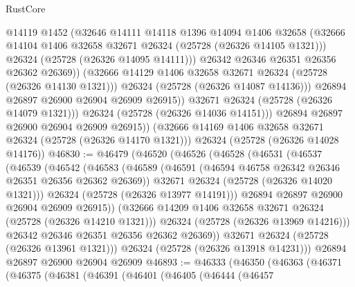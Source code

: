 \begin{lexlean}{RustCore}
\begin{coremodule}
                      @14119
                      @1452
                      (@32646
                        @14111
                        @14118
                        @1396
                        @14094
                        @1406
                        @32658
                        (@32666 @14104 @1406 @32658 @32671 @26324 (@25728 (@26326 @14105 @1321)))
                        @26324
                        (@25728 (@26326 @14095 @14111)))
                      @26342
                      @26346
                      @26351
                      @26356
                      @26362
                      @26369))
                  (@32666 @14129 @1406 @32658 @32671 @26324 (@25728 (@26326 @14130 @1321)))
                  @26324
                  (@25728 (@26326 @14087 @14136)))
                @26894
                @26897
                @26900
                @26904
                @26909
                @26915))
            @32671
            @26324
            (@25728 (@26326 @14079 @1321)))
          @26324
          (@25728 (@26326 @14036 @14151)))
        @26894
        @26897
        @26900
        @26904
        @26909
        @26915))
    (@32666 @14169 @1406 @32658 @32671 @26324 (@25728 (@26326 @14170 @1321)))
    @26324
    (@25728 (@26326 @14028 @14176))
@46830 := @46479
    (@46520
      (@46526
        (@46528
          (@46531
            (@46537
              (@46539
                (@46542
                  (@46583
                    (@46589
                      (@46591 (@46594 @46758 @26342 @26346 @26351 @26356 @26362 @26369))
                      @32671
                      @26324
                      (@25728 (@26326 @14020 @1321)))
                    @26324
                    (@25728 (@26326 @13977 @14191)))
                  @26894
                  @26897
                  @26900
                  @26904
                  @26909
                  @26915))
              (@32666 @14209 @1406 @32658 @32671 @26324 (@25728 (@26326 @14210 @1321)))
              @26324
              (@25728 (@26326 @13969 @14216)))
            @26342
            @26346
            @26351
            @26356
            @26362
            @26369))
        @32671
        @26324
        (@25728 (@26326 @13961 @1321)))
      @26324
      (@25728 (@26326 @13918 @14231)))
    @26894
    @26897
    @26900
    @26904
    @26909
@46893 := @46333
    (@46350
      (@46363
        (@46371
          (@46375
            (@46381
              (@46391
                (@46401
                  (@46405
                    (@46444
                      (@46457

\end{coremodule}
\end{lexlean}

